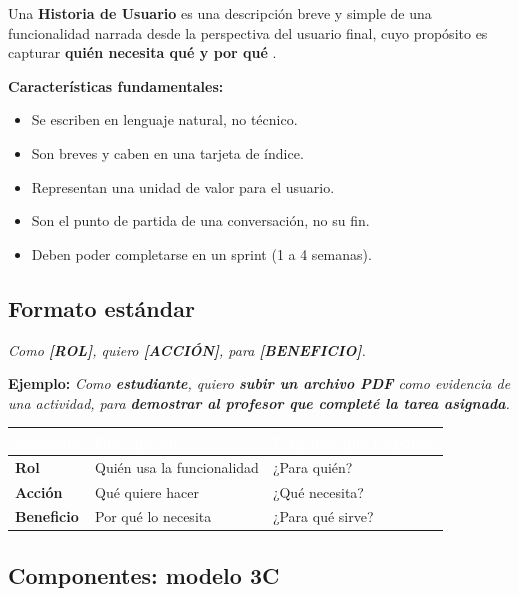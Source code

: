 \documentclass[12pt, a4paper]{article}
\begin{document}
Una \textbf{Historia de Usuario} es una descripción breve y simple de una
funcionalidad narrada desde la perspectiva del usuario final, cuyo propósito
es capturar \textbf{quién necesita qué y por qué}
\parencite{cohn2004}.

\textbf{Características fundamentales:}
\begin{itemize}[noitemsep, leftmargin=1.5cm]
  \item Se escriben en lenguaje natural, no técnico.
  \item Son breves y caben en una tarjeta de índice.
  \item Representan una unidad de valor para el usuario.
  \item Son el punto de partida de una conversación, no su fin.
  \item Deben poder completarse en un sprint (1 a 4 semanas).
\end{itemize}

\subsection{Formato estándar}

\begin{ejemplobox}
  \textit{Como \textbf{[ROL]}, quiero \textbf{[ACCIÓN]}, para \textbf{[BENEFICIO]}.}

  \vspace{0.3cm}
  \textbf{Ejemplo:} \textit{Como \textbf{estudiante}, quiero
  \textbf{subir un archivo PDF} como evidencia de una actividad, para
  \textbf{demostrar al profesor que completé la tarea asignada}.}
\end{ejemplobox}

\vspace{0.3cm}
\begin{tabular}{>{\bfseries}p{2.5cm} p{5cm} p{5cm}}
  \toprule
  \rowcolor{espeazul}
  \textcolor{white}{Elemento} & \textcolor{white}{Descripción} & \textcolor{white}{Pregunta que responde} \\
  \midrule
  Rol       & Quién usa la funcionalidad & ¿Para quién? \\
  Acción    & Qué quiere hacer           & ¿Qué necesita? \\
  Beneficio & Por qué lo necesita        & ¿Para qué sirve? \\
  \bottomrule
\end{tabular}

\subsection{Componentes: modelo 3C}
\end{document}
